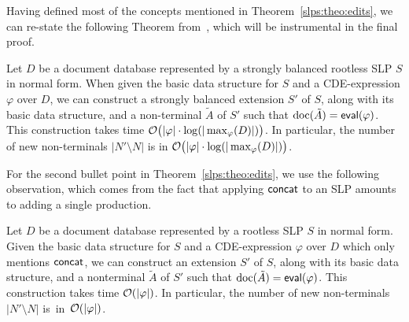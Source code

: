 
Having defined most of the concepts mentioned in Theorem~\ref{slps:theo:edits}, we can re-state the following Theorem from~\cite{SchmidS22}, which will be instrumental in the final proof.

\begin{theorem}\label{slps:theo:cedits}
	Let $D$ be a document database represented by a strongly balanced rootless SLP $S$ in normal form. When given the basic data structure for $S$ and a CDE-expression $\varphi$ over $D$, we can construct a strongly balanced extension $S'$ of $S$, along with its basic data structure, and a non-terminal $\tilde{A}$ of $S'$ such that $\operatorname{doc}(\tilde{A}) = \textsf{eval}(\varphi)$.
	This construction takes time $\mathcal{O}\big(|\varphi|\cdot \log(|\max_{\varphi}(D)|)\big)$.  In particular, the number of new non-terminals $|N'\setminus N|$ is in $\mathcal{O}\big(|\varphi|\cdot \log( |\max_{\varphi}(D)|)\big)$.
\end{theorem}


For the second bullet point in Theorem~\ref{slps:theo:edits}, we use the following observation, which comes from the fact that applying $\textsf{concat}$ to an SLP amounts to adding a single production.

\begin{observation}\label{slps:obs:concat}
	Let $D$ be a document database represented by a rootless SLP $S$ in normal form. Given the basic data structure for $S$ and a CDE-expression $\varphi$ over $D$ which only mentions $\textsf{concat}$, we can construct an extension $S'$ of $S$, along with its basic data structure, and a nonterminal $\tilde{A}$ of $S'$ such that $\operatorname{doc}(\tilde{A}) = \textsf{eval}(\varphi)$. This construction takes time $\mathcal{O}(|\varphi|)$. In particular, the number of new non-terminals $|N'\setminus N|$ is~in~$\mathcal{O}(|\varphi|)$.
\end{observation}

